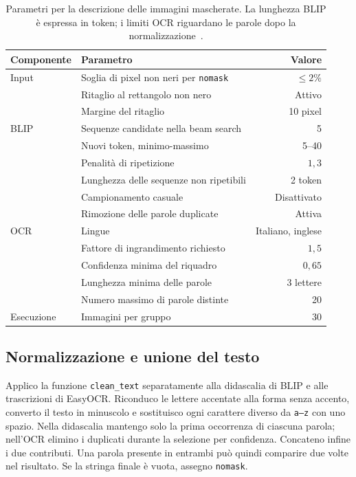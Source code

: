 \begin{table}[htbp]
    \centering
    \small
    \caption{Parametri per la descrizione delle immagini mascherate. La lunghezza BLIP è espressa in token; i limiti OCR riguardano le parole dopo la normalizzazione~\cite{pmlr-v162-li22n, easyocr_software}.}
    \label{tab:descrizioni-parametri}
    \begin{tabular}{@{}llr@{}}
        \toprule
        Componente & Parametro & Valore \\
        \midrule
        Input & Soglia di pixel non neri per \texttt{nomask} & $\leq 2\%$ \\
              & Ritaglio al rettangolo non nero & Attivo \\
              & Margine del ritaglio & 10 pixel \\
        \addlinespace
        BLIP & Sequenze candidate nella beam search & 5 \\
             & Nuovi token, minimo-massimo & 5--40 \\
             & Penalità di ripetizione & $1{,}3$ \\
             & Lunghezza delle sequenze non ripetibili & 2 token \\
             & Campionamento casuale & Disattivato \\
             & Rimozione delle parole duplicate & Attiva \\
        \addlinespace
        OCR & Lingue & Italiano, inglese \\
            & Fattore di ingrandimento richiesto & $1{,}5$ \\
            & Confidenza minima del riquadro & $0{,}65$ \\
            & Lunghezza minima delle parole & 3 lettere \\
            & Numero massimo di parole distinte & 20 \\
        \addlinespace
        Esecuzione & Immagini per gruppo & 30 \\
        \bottomrule
    \end{tabular}
\end{table}

\newpage
\subsection{Normalizzazione e unione del testo}
\label{subsec:metodi-descrizioni-output}

Applico la funzione \texttt{clean\_text} separatamente alla didascalia di BLIP e alle trascrizioni di EasyOCR. Riconduco le lettere accentate alla forma senza accento, converto il testo in minuscolo e sostituisco ogni carattere diverso da \texttt{a--z} con uno spazio. Nella didascalia mantengo solo la prima occorrenza di ciascuna parola; nell'OCR elimino i duplicati durante la selezione per confidenza. Concateno infine i due contributi. Una parola presente in entrambi può quindi comparire due volte nel risultato. Se la stringa finale è vuota, assegno \texttt{nomask}.

